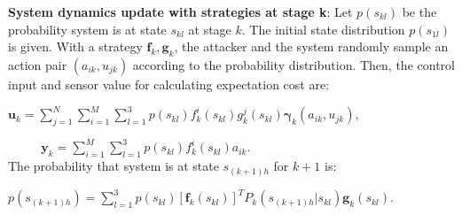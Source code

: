 \textbf{System dynamics update with strategies at stage k}:
 Let $p(s_{kl})$ be the probability system is at state $s_{kl}$ at stage $k$. The initial state distribution $p(s_{1l})$ is given. With  a strategy $\mathbf{f}_{k},\mathbf{g}_{k}$, the attacker and the system randomly sample an action pair $(a_{ik}, u_{jk})$ according to the probability distribution. Then, the control input and sensor value for calculating expectation cost are: 
\centerline{$
\mathbf{u}_{k}=\sum\limits_{j=1}^{N}\sum\limits_{i=1}^{M} \sum\limits_{l=1}^{3}p(s_{kl})f_{k}^{i}(s_{kl})g^{j}_{k}(s_{kl})\mathbf{\gamma}_{k}(a_{ik},u_{jk}),
$}
$\text{ }\quad\quad\mathbf{y}_{k} =\sum\limits_{i=1}^{M}\sum\limits_{l=1}^{3} p(s_{kl})f_{k}^{i}(s_{kl}) a_{ik}.$
\\The probability that system is at state $s_{(k+1)h}$ for $k+1$ is:
\\\centerline{$
p(s_{(k+1)h})= \sum\limits_{l=1}^{3}p(s_{kl})[\mathbf{f}_{k}(s_{kl})]^{T}{P}_{k}(s_{(k+1)h}|s_{kl})\mathbf{g}_{k}(s_{kl}). 
$}

\iffalse
\begin{align*}
\mathbf{F}_{k} :=\{&\mathbf{f}_{k}= [\mathbf{f}_{k}(s_{k1}), \mathbf{f}_{k}(s_{k2}), \mathbf{f}_{k}(s_{k3})]
|f_{k}^{i}(s_{kl})\geq 0,\\& \mathbf{f}_k \in [0,1]^{M\times 3} %
\sum \limits_{a_{ik} \in A_{tk}}f_{k}^{i}(s_{kl}) = 1,\mathbf{f}_{k}(s_{kl})\in \mathbb{R}^{M},\\&\forall s_{kl} \in(X_{[k-T,k]}\times S)\},\\
\mathbf{G}_{k}:=\{&\mathbf{g}_{k}= [\mathbf{g}_{k}(s_{k1}), \mathbf{g}_{k}(s_{k2}), \mathbf{g}_{k}(s_{k3})]|
g_{k}^{j}(s_{kl})\geq 0,\\& \mathbf{g}_k \in [0,1]^{N \times 3}, %
\sum \limits_{u_{jk} \in A_{sk}}g_{k}^{j}(s_{kl}) = 1, \mathbf{g}_{k}(s_{kl}) \in \mathbb{R}^{N},\\ &\forall s_{kl} \in (X_{[k-T,k]}\times S)\}. 
\end{align*} 
\fi